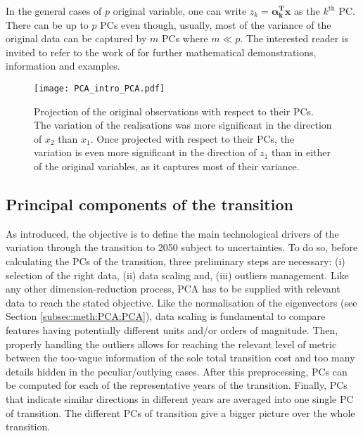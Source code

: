 In the general cases of $p$ original variable, one can write $z_k=\mathbf{\alpha_k^{T}x}$ as the $k^{\text{th}}$ PC. There can be up to $p$ PCs even though, usually, most of the variance of the original data can be captured by $m$ PCs where $m\ll p$. The interested reader is invited to refer to the work of \citet{jolliffe2002principal} for further mathematical demonstrations, information and examples.

\begin{figure}[!htbp]
\centering
\texttt{[image: PCA\_intro\_PCA.pdf]}
\caption{Projection of the original observations with respect to their PCs. The variation of the realisations was more significant in the direction of $x_2$ than $x_1$. Once projected with respect to their PCs, the variation is even more significant in the direction of $z_1$ than in either of the original variables, as it captures most of their variance. }
\label{fig:PCA_intro_PCA}
\end{figure}

\subsection{Principal components of the transition}
\label{subsec:meth:PCA:transition}
As introduced, the objective is to define the main technological drivers of the variation through the transition to 2050 subject to uncertainties. To do so, before calculating the PCs of the transition, three preliminary steps are necessary: (i) selection of the right data, (ii) data scaling and, (iii) outliers management. Like any other dimension-reduction process, \gls{PCA} has to be supplied with relevant data to reach the stated objective.  Like the normalisation of the eigenvectors (see Section \ref{subsec:meth:PCA:PCA}), data scaling is fundamental to compare features having potentially different units and/or orders of magnitude. Then, properly handling the outliers allows for reaching the relevant level of metric between the too-vague information of the sole total transition cost and too many details hidden in the peculiar/outlying cases. After this preprocessing, PCs can be computed for each of the representative years of the transition. Finally, PCs that indicate similar directions in different years are averaged into one single PC of transition. The different PCs of transition give a bigger picture over the whole transition.\\

\\


